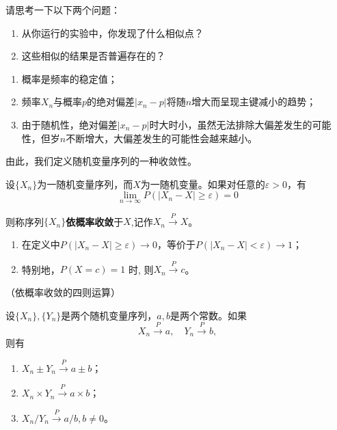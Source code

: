 请思考一下以下两个问题：
\begin{problem}
    \begin{enumerate}
        \item 从你运行的实验中，你发现了什么相似点？
        \item 这些相似的结果是否普遍存在的？
    \end{enumerate}
\end{problem}


\begin{conclusion}
    \begin{enumerate}
    \item 概率是频率的稳定值；
    \item 频率$X_n$与概率$p$的绝对偏差$\left|x_{n}-p\right|$将随$n$增大而呈现主键减小的趋势；
    \item 由于随机性，绝对偏差$\left|x_{n}-p\right|$时大时小，虽然无法排除大偏差发生的可能性，但岁$n$不断增大，大偏差发生的可能性会越来越小。
\end{enumerate}
\end{conclusion}


由此，我们定义随机变量序列的一种收敛性。
\begin{definition}
设$\{X_n\}$为一随机变量序列，而$X$为一随机变量。如果对任意的$\varepsilon>0$，有  
$$
\lim _{n \rightarrow \infty} P\left(\left|X_{n}-X\right| \geqslant \varepsilon\right)=0$$

则称序列$\{X_n\}$\textbf{依概率收敛}于$X$,记作$X_{n} \stackrel{P}{\longrightarrow} X$。
\end{definition}
\begin{remark}
\begin{enumerate}
    \item 在定义中$P\left(\left|X_{n}-X\right| \geqslant \varepsilon\right) \rightarrow 0 $，等价于$P\left(\left|X_{n}-X\right|<\varepsilon\right) \rightarrow 1$；
    \item 特别地，$P(X=c)=1$ 时, 则$X_{n}\stackrel{P}{\longrightarrow} c$。
\end{enumerate}    
\end{remark}


\newpage
\begin{property}{（依概率收敛的四则运算）}

设$\{X_n\}, \{Y_n\}$是两个随机变量序列，$a,b$是两个常数。如果
$$X_{n} \stackrel{P}{\longrightarrow} a, \quad Y_{n} \stackrel{P}{\longrightarrow} b,$$
则有
\begin{enumerate}
    \item $X_{n} \pm Y_{n} \stackrel{P}{\rightarrow} a \pm b $；
    \item $X_{n} \times Y_{n} \stackrel{P}{\rightarrow} a \times b $；
    \item $ X_{n} / Y_{n} \stackrel{P}{\rightarrow} a / b, b \neq 0 $。
\end{enumerate}
\end{property}

